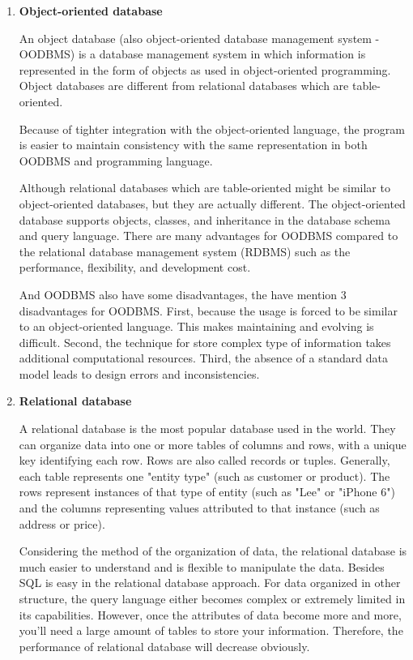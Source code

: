 \begin{enumerate}
	\item\textbf{Object-oriented database}
	\setlength{\parindent}{1em}
	
	
	An object database (also object-oriented database management system - OODBMS) is a database management system in which information is represented in the form of objects as used in object-oriented programming. Object databases are different from relational databases which are table-oriented.
	
	Because of tighter integration with the object-oriented language, the program is easier to maintain consistency with the same representation in both OODBMS and programming language.
	
	Although relational databases which are table-oriented might be similar to object-oriented databases, but they are actually different. The object-oriented database supports objects, classes, and inheritance in the database schema and query language.
	There are many advantages for OODBMS compared to the relational database management system (RDBMS) such as the performance, flexibility, and development cost.
	
	And OODBMS also have some disadvantages, the have mention 3 disadvantages for OODBMS. First, because the usage is forced to be similar to an object-oriented language. This makes maintaining and evolving is difficult. Second, the technique for store complex type of information takes additional computational resources. Third, the absence of a standard data model leads to design errors and inconsistencies.
	
	
	\item\textbf{Relational database}
	\setlength{\parindent}{1em}
	
	A relational database is the most popular database used in the world. 
	They can organize data into one or more tables of columns and rows, with a unique key identifying each row. 
	Rows are also called records or tuples. Generally, each table represents one "entity type" (such as customer or product). 
	The rows represent instances of that type of entity (such as "Lee" or "iPhone 6") and the columns representing values attributed to that instance (such as address or price).
	
	Considering the method of the organization of data, the relational database is much easier to understand and is flexible to manipulate the data. 
	Besides SQL is easy in the relational database approach. For data organized in other structure, the query language either becomes complex or extremely limited in its capabilities. 
	However, once the attributes of data become more and more, you'll need a large amount of tables to store your information. 
	Therefore, the performance of relational database will decrease obviously.
	

\end{enumerate}
